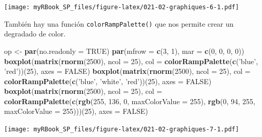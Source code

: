\documentclass[
]{book}
\newenvironment{Shaded}{\begin{snugshade}}{\end{snugshade}}
\newcommand{\DataTypeTok}[1]{\textcolor[rgb]{0.13,0.29,0.53}{#1}}
\newcommand{\DecValTok}[1]{\textcolor[rgb]{0.00,0.00,0.81}{#1}}
\newcommand{\KeywordTok}[1]{\textcolor[rgb]{0.13,0.29,0.53}{\textbf{#1}}}
\newcommand{\NormalTok}[1]{#1}
\newcommand{\OtherTok}[1]{\textcolor[rgb]{0.56,0.35,0.01}{#1}}
\newcommand{\StringTok}[1]{\textcolor[rgb]{0.31,0.60,0.02}{#1}}
\begin{document}
\texttt{[image: myRBook\_SP\_files/figure-latex/021-02-graphiques-6-1.pdf]}

También hay una función \texttt{colorRampPalette()} que nos permite crear un degradado de color.

\begin{Shaded}
\begin{Highlighting}[]
\NormalTok{op <-}\StringTok{ }\KeywordTok{par}\NormalTok{(}\DataTypeTok{no.readonly =} \OtherTok{TRUE}\NormalTok{)}
\KeywordTok{par}\NormalTok{(}\DataTypeTok{mfrow =} \KeywordTok{c}\NormalTok{(}\DecValTok{3}\NormalTok{, }\DecValTok{1}\NormalTok{), }\DataTypeTok{mar =} \KeywordTok{c}\NormalTok{(}\DecValTok{0}\NormalTok{, }\DecValTok{0}\NormalTok{, }\DecValTok{0}\NormalTok{, }\DecValTok{0}\NormalTok{))}
\KeywordTok{boxplot}\NormalTok{(}\KeywordTok{matrix}\NormalTok{(}\KeywordTok{rnorm}\NormalTok{(}\DecValTok{2500}\NormalTok{), }\DataTypeTok{ncol =} \DecValTok{25}\NormalTok{), }
        \DataTypeTok{col =} \KeywordTok{colorRampPalette}\NormalTok{(}\KeywordTok{c}\NormalTok{(}\StringTok{'blue'}\NormalTok{, }\StringTok{'red'}\NormalTok{))(}\DecValTok{25}\NormalTok{), }\DataTypeTok{axes =} \OtherTok{FALSE}\NormalTok{)}
\KeywordTok{boxplot}\NormalTok{(}\KeywordTok{matrix}\NormalTok{(}\KeywordTok{rnorm}\NormalTok{(}\DecValTok{2500}\NormalTok{), }\DataTypeTok{ncol =} \DecValTok{25}\NormalTok{), }
        \DataTypeTok{col =} \KeywordTok{colorRampPalette}\NormalTok{(}\KeywordTok{c}\NormalTok{(}\StringTok{'blue'}\NormalTok{, }\StringTok{'white'}\NormalTok{, }\StringTok{'red'}\NormalTok{))(}\DecValTok{25}\NormalTok{), }\DataTypeTok{axes =} \OtherTok{FALSE}\NormalTok{)}
\KeywordTok{boxplot}\NormalTok{(}\KeywordTok{matrix}\NormalTok{(}\KeywordTok{rnorm}\NormalTok{(}\DecValTok{2500}\NormalTok{), }\DataTypeTok{ncol =} \DecValTok{25}\NormalTok{), }
        \DataTypeTok{col =}  \KeywordTok{colorRampPalette}\NormalTok{(}\KeywordTok{c}\NormalTok{(}\KeywordTok{rgb}\NormalTok{(}\DecValTok{255}\NormalTok{, }\DecValTok{136}\NormalTok{, }\DecValTok{0}\NormalTok{, }\DataTypeTok{maxColorValue =} \DecValTok{255}\NormalTok{),  }
                                  \KeywordTok{rgb}\NormalTok{(}\DecValTok{0}\NormalTok{, }\DecValTok{94}\NormalTok{, }\DecValTok{255}\NormalTok{, }\DataTypeTok{maxColorValue =} \DecValTok{255}\NormalTok{)))(}\DecValTok{25}\NormalTok{), }
        \DataTypeTok{axes =} \OtherTok{FALSE}\NormalTok{)}
\end{Highlighting}
\end{Shaded}

\texttt{[image: myRBook\_SP\_files/figure-latex/021-02-graphiques-7-1.pdf]}
\end{document}
